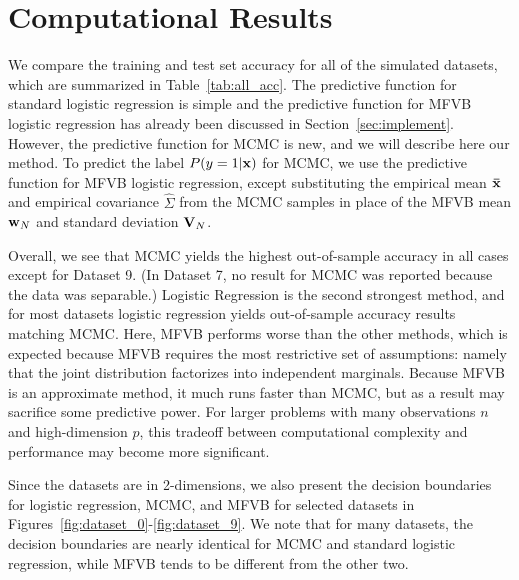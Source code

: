 
\section{Computational Results}\label{sec:comp}

We compare the training and test set accuracy for all of the simulated datasets, which are summarized in Table~\ref{tab:all_acc}.
The predictive function for standard logistic regression is simple and the predictive function for MFVB logistic regression has already been discussed in Section~\ref{sec:implement}.  However, the predictive function for MCMC is new, and we will describe here our method.  To predict the label $P(y=1|\boldsymbol{\mathbf{x}})$ for MCMC, we use the predictive function for MFVB logistic regression, except substituting the empirical mean $\boldsymbol{\mathbf{\bar x}}$ and empirical covariance ${\hat \Sigma}$ from the MCMC samples in place of the MFVB mean $\boldsymbol{\mathbf{w}}_N$ and standard deviation $\boldsymbol{\mathbf{V}}_N$.
 
Overall, we see that MCMC yields the highest out-of-sample accuracy in all cases except for Dataset 9.  (In Dataset 7, no result for
MCMC was reported because the data was separable.)  Logistic Regression is the second strongest method, and for most datasets logistic regression yields out-of-sample accuracy results matching MCMC.  Here, MFVB performs worse than the other methods, which is expected because MFVB requires the most restrictive set of assumptions: namely that the joint distribution factorizes into independent marginals.  Because MFVB is an approximate method, it much runs faster than MCMC, but as a result may sacrifice some predictive power.  For larger problems with many observations $n$ and high-dimension $p$, this tradeoff between computational complexity and performance may become more significant.  

Since the datasets are in 2-dimensions, we also present the decision boundaries for logistic regression, MCMC, and MFVB for selected datasets in Figures~\ref{fig:dataset_0}-\ref{fig:dataset_9}.  We note that for many datasets, the decision boundaries are nearly identical for MCMC and standard logistic regression, while MFVB tends to be different from the other two.  




